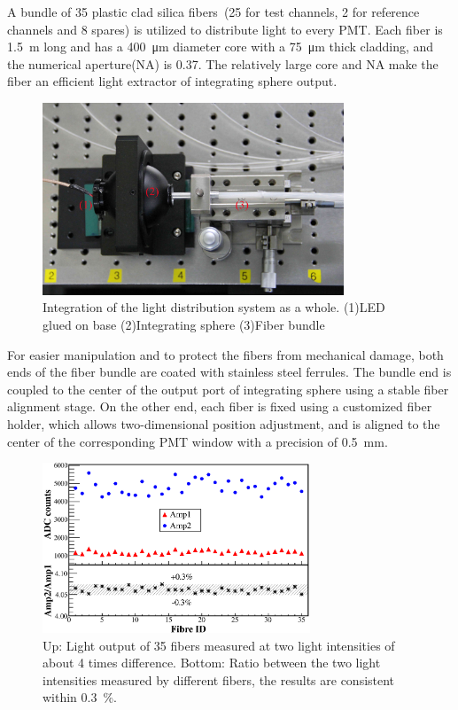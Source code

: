 \documentclass[review, times]{elsarticle}
\begin{document}
A bundle of 35 plastic clad silica fibers~\cite{optical_fibre}(25 for test channels, 2 for reference channels and 8 spares) is utilized to distribute light to every PMT.
Each fiber is \SI{1.5}{\meter} long and has a \SI{400}{\micro\meter} diameter core with a \SI{75}{\micro\meter} thick cladding, and the numerical aperture(NA) is 0.37.
The relatively large core and NA make the fiber an efficient light extractor of integrating sphere output. 

\begin{figure}
 \centering
 \includegraphics[width=90mm]{light_dist_label}
\caption{Integration of the light distribution system as a whole.
(1)LED glued on base (2)Integrating sphere (3)Fiber bundle}
\label{fig:light_source}
\end{figure} 

For easier manipulation and to protect the fibers from mechanical damage, both ends of the fiber bundle are coated with stainless steel ferrules.
The bundle end is coupled to the center of the output port of integrating sphere using a stable fiber alignment stage.
On the other end, each fiber is fixed using a customized fiber holder, which allows two-dimensional position adjustment, and is aligned to the center of the corresponding PMT window with a precision of \SI{0.5}{\milli\meter}.

\begin{figure}
 \centering
 \includegraphics[width=80mm]{fibre_diff}
\caption{Up: Light output of 35 fibers measured at two light intensities of about 4 times difference.
Bottom: Ratio between the two light intensities measured by different fibers, the results are consistent within \textpm\SI{0.3}{\percent}.}
\label{fig:fibre_diff}
\end{figure} 
\end{document}
